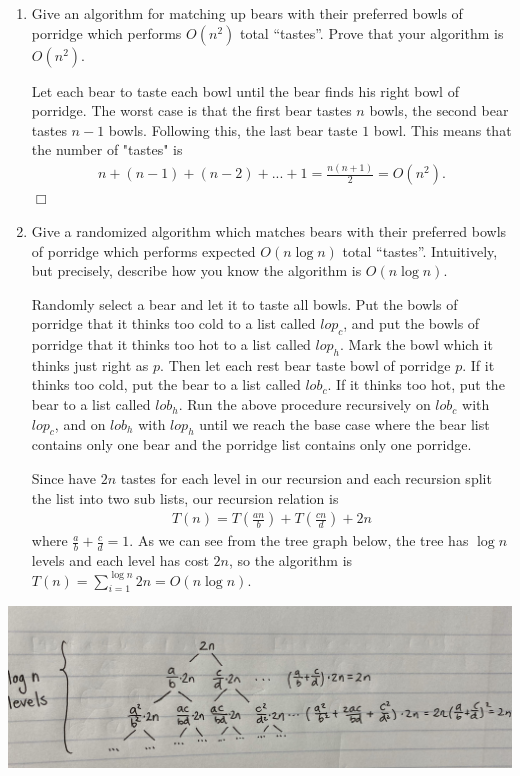 \documentclass[10pt]{article}
\newenvironment{proof}{\par\noindent{\it Proof.}\hspace*{1em}}{$\Box$\bigskip}
\begin{document}
\begin{enumerate}
    \item Give an algorithm for matching up bears with their preferred bowls of porridge which performs $O(n^2)$ total ``tastes''. Prove that your algorithm is $O(n^2)$.
    \begin{proof}
    Let each bear to taste each bowl until the bear finds his right bowl of porridge. The worst case is that the first bear tastes $n$ bowls, the second bear tastes $n-1$ bowls. Following this, the last bear taste $1$
    bowl. This means that the number of "tastes" is 
    \begin{align}
        n+(n-1)+(n-2)+...+1 = \frac{n(n+1)}{2} = O(n^2).
    \end{align}
    \end{proof}
    \item Give a randomized algorithm which matches bears with their preferred bowls of porridge which performs expected $O(n \log n)$ total ``tastes''. Intuitively, but precisely, describe how you know the algorithm is $O(n \log n)$.
    
    Randomly select a bear and let it to taste all bowls. Put the bowls of porridge that it thinks too cold to a list called $lop_c$, and put the bowls of porridge that it thinks too hot to a list called $lop_h$. Mark the bowl which it thinks just right as $p$. Then let each rest bear taste bowl of porridge $p$. If it thinks too cold, put the bear to a list called $lob_c$. If it thinks too hot, put the bear to a list called $lob_h$. Run the above procedure recursively on $lob_c$ with $lop_c$, and on $lob_h$ with $lop_h$ until we reach the base case where the bear list contains only one bear and the porridge list contains only one porridge.
    
    Since have $2n$ tastes for each level in our recursion and each recursion split the list into two sub lists, our recursion relation is 
    \begin{align}
        T(n) = T(\frac{an}{b})+T(\frac{cn}{d}) + 2n 
    \end{align}
    where $\frac{a}{b}+\frac{c}{d} = 1$. As we can see from the tree graph below, the tree has $\log n$ levels and each level has cost $2n$, so the algorithm is $T(n)=\sum_{i=1}^{\log n}2n =O(n \log n)$.
\end{enumerate}
\includegraphics[scale=0.1]{pic1.jpeg}
\end{document}
